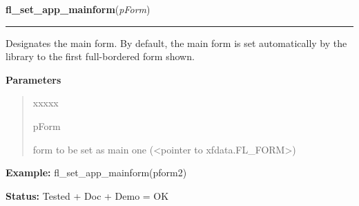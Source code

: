 \hspace{.8\funcindent}\begin{boxedminipage}{\funcwidth}

    \raggedright \textbf{fl\_set\_app\_mainform}(\textit{pForm})

    \vspace{-1.5ex}

    \rule{\textwidth}{0.5\fboxrule}
\setlength{\parskip}{2ex}
    Designates the main form. By default, the main form is set 
    automatically by the library to the first full-bordered form shown.

\setlength{\parskip}{1ex}
      \textbf{Parameters}
      \vspace{-1ex}

      \begin{quote}
        \begin{Ventry}{xxxxx}

          \item[pForm]

          form to be set as main one ({\textless}pointer to 
          xfdata.FL\_FORM{\textgreater})

        \end{Ventry}

      \end{quote}

\textbf{Example:} fl\_set\_app\_mainform(pform2)



\textbf{Status:} Tested + Doc + Demo = OK



    \end{boxedminipage}

    \label{xformslib:library:fl_get_app_mainform}

    \vspace{0.5ex}

